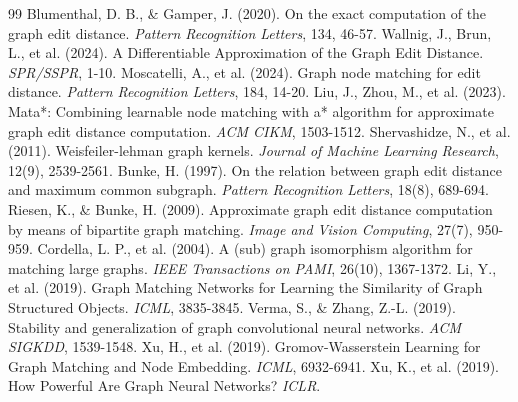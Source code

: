 \begin{thebibliography}{99}
 Blumenthal, D. B., \& Gamper, J. (2020). On the exact computation of the graph edit distance. \textit{Pattern Recognition Letters}, 134, 46-57.
 Wallnig, J., Brun, L., et al. (2024). A Differentiable Approximation of the Graph Edit Distance. \textit{SPR/SSPR}, 1-10.
 Moscatelli, A., et al. (2024). Graph node matching for edit distance. \textit{Pattern Recognition Letters}, 184, 14-20.
 Liu, J., Zhou, M., et al. (2023). Mata*: Combining learnable node matching with a* algorithm for approximate graph edit distance computation. \textit{ACM CIKM}, 1503-1512.
 Shervashidze, N., et al. (2011). Weisfeiler-lehman graph kernels. \textit{Journal of Machine Learning Research}, 12(9), 2539-2561.
 Bunke, H. (1997). On the relation between graph edit distance and maximum common subgraph. \textit{Pattern Recognition Letters}, 18(8), 689-694.
 Riesen, K., \& Bunke, H. (2009). Approximate graph edit distance computation by means of bipartite graph matching. \textit{Image and Vision Computing}, 27(7), 950-959.
 Cordella, L. P., et al. (2004). A (sub) graph isomorphism algorithm for matching large graphs. \textit{IEEE Transactions on PAMI}, 26(10), 1367-1372.
 Li, Y., et al. (2019). Graph Matching Networks for Learning the Similarity of Graph Structured Objects. \textit{ICML}, 3835-3845.
 Verma, S., \& Zhang, Z.-L. (2019). Stability and generalization of graph convolutional neural networks. \textit{ACM SIGKDD}, 1539-1548.
 Xu, H., et al. (2019). Gromov-Wasserstein Learning for Graph Matching and Node Embedding. \textit{ICML}, 6932-6941.
 Xu, K., et al. (2019). How Powerful Are Graph Neural Networks? \textit{ICLR}.
\end{thebibliography}